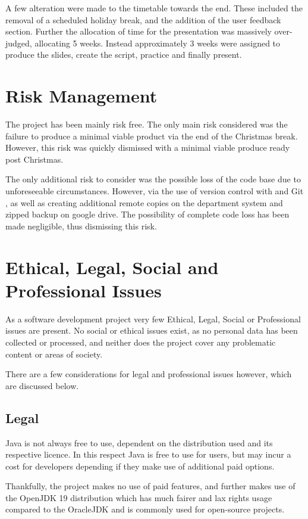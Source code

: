 A few alteration were made to the timetable towards the end. These included the removal of a scheduled holiday break, and the addition of the user feedback section. Further the allocation of time for the presentation was massively over-judged, allocating 5 weeks. Instead approximately 3 weeks were assigned to produce the slides, create the script, practice and finally present.

\section{Risk Management}
The project has been mainly risk free. The only main risk considered was the failure to produce a minimal viable product via the end of the Christmas break. However, this risk was quickly dismissed with a minimal viable produce ready post Christmas.

The only additional risk to consider was the possible loss of the code base due to unforeseeable circumstances. However, via the use of version control with \cite{github_2013_build} and Git \cite{git_2022_git}, as well as creating additional remote copies on the department system and zipped backup on google drive. The possibility of complete code loss has been made negligible, thus dismissing this risk.

\section{Ethical, Legal, Social and Professional Issues}
As a software development project very few Ethical, Legal, Social or Professional issues are present. No social or ethical issues exist, as no personal data has been collected or processed, and neither does the project cover any problematic content or areas of society.

There are a few considerations for legal and professional issues however, which are discussed below.

\subsection{Legal}
Java is not always free to use, dependent on the distribution used and its respective licence. In this respect Java is free to use for users, but may incur a cost for developers depending if they make use of additional paid options.

Thankfully, the project makes no use of paid features, and further makes use of the OpenJDK 19 \cite{oraclecorporation_2022_openjdk} distribution which has much fairer and lax rights usage compared to the OracleJDK and is commonly used for open-source projects.


